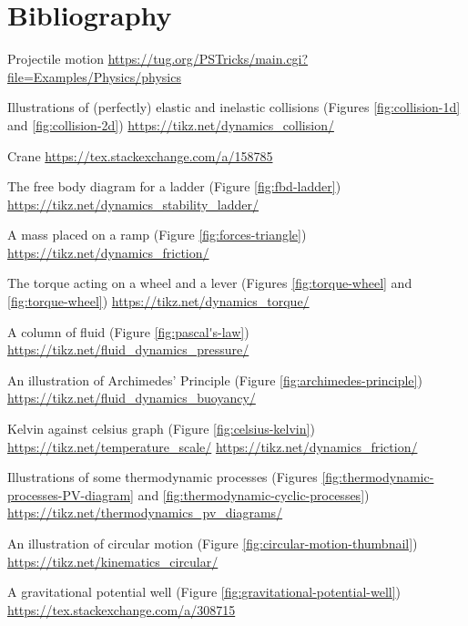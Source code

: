 \chapter{Bibliography} 
\begin{enumerate}[label={[\arabic*]}]
    \item\label{Projectile motion} Projectile motion \url{https://tug.org/PSTricks/main.cgi?file=Examples/Physics/physics}
    \item\label{source:collision} Illustrations of (perfectly) elastic and inelastic collisions (Figures \ref{fig:collision-1d} and \ref{fig:collision-2d}) \url{https://tikz.net/dynamics_collision/}
    \item\label{Crane} Crane \url{https://tex.stackexchange.com/a/158785}
    \item\label{source:fbd-ladder} The free body diagram for a ladder (Figure \ref{fig:fbd-ladder}) \url{https://tikz.net/dynamics_stability_ladder/} 
    \item\label{source:forces-triangle} A mass placed on a ramp (Figure \ref{fig:forces-triangle}) \url{https://tikz.net/dynamics_friction/}
    \item\label{source:torque} The torque acting on a wheel and a lever (Figures \ref{fig:torque-wheel} and \ref{fig:torque-wheel}) \url{https://tikz.net/dynamics_torque/}
    \item\label{source:pascal's-law} A column of fluid (Figure \ref{fig:pascal's-law}) \url{https://tikz.net/fluid_dynamics_pressure/}
    \item\label{source:archimedes-principle} An illustration of Archimedes' Principle (Figure \ref{fig:archimedes-principle}) \url{https://tikz.net/fluid_dynamics_buoyancy/}
    \item\label{source:celsius-kelvin} Kelvin against celsius graph (Figure \ref{fig:celsius-kelvin}) \url{https://tikz.net/temperature_scale/} \url{https://tikz.net/dynamics_friction/}
    \item\label{source:thermodynamic-processes} Illustrations of some thermodynamic processes (Figures \ref{fig:thermodynamic-processes-PV-diagram} and \ref{fig:thermodynamic-cyclic-processes}) \url{https://tikz.net/thermodynamics_pv_diagrams/}
    \item\label{source:circular-motion-thumbnail} An illustration of circular motion (Figure \ref{fig:circular-motion-thumbnail}) \url{https://tikz.net/kinematics_circular/} 
    \item\label{source:gravitational-potential-well} A gravitational potential well (Figure \ref{fig:gravitational-potential-well}) \url{https://tex.stackexchange.com/a/308715}

\end{enumerate}
